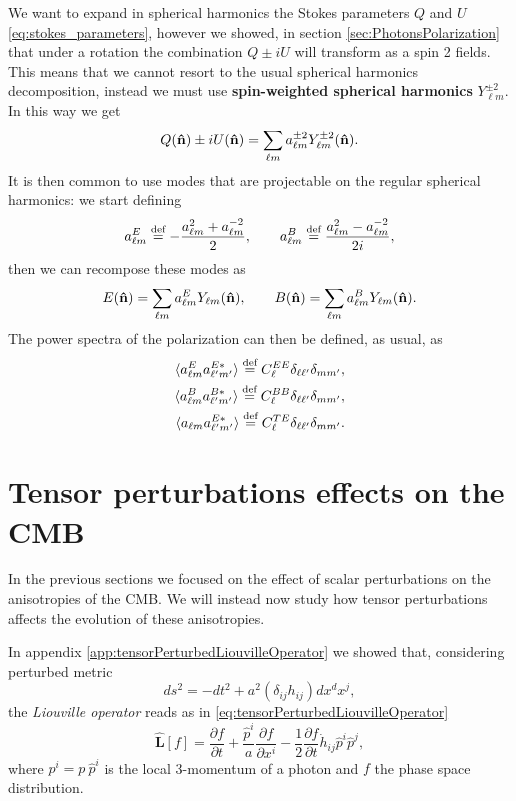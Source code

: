 We want to expand in spherical harmonics the Stokes parameters $Q$ and $U$\eqref{eq:stokes_parameters}, however we showed, in section \ref{sec:PhotonsPolarization} that under a rotation the combination $Q\pm iU$ will transform as a spin 2 fields. This means that we cannot resort to the usual spherical harmonics decomposition, instead we must use \textbf{spin-weighted spherical harmonics} $Y_{\ell m}^{\pm2}$. In this way we get 
$$Q(\mathbf{\hat{n}})\pm iU(\mathbf{\hat{n}}) = \sum_{\ell m}a_{\ell m}^{\pm 2}Y_{\ell m}^{\pm2}(\mathbf{\hat{n}}).$$
It is then common to use modes that are projectable on the regular spherical harmonics: we start defining
$$a^E_{\ell m}\stackrel{\text{def}}{=}-\frac{a^2_{\ell m}+a^{-2}_{\ell m}}{2},\qquad a^B_{\ell m}\stackrel{\text{def}}{=}\frac{a^2_{\ell m}-a^{-2}_{\ell m}}{2i},$$
then we can recompose these modes as
\begin{equation}\label{eq:EBmodes}
    E(\mathbf{\hat{n}})=\sum_{\ell m}a^E_{\ell m}Y_{\ell m}(\mathbf{\hat{n}}),\qquad B(\mathbf{\hat{n}})=\sum_{\ell m}a^B_{\ell m}Y_{\ell m}(\mathbf{\hat{n}}).
\end{equation}
The power spectra of the polarization can then be defined, as usual, as
\begin{align}\label{eq:PolPowerSpectrum}
    \langle a^E_{\ell m}a^{E*}_{\ell' m'}\rangle\stackrel{\text{def}}{=} C_{\ell}^{EE}\delta_{\ell \ell'}\delta_{m m'},\\ \langle a^B_{\ell m}a^{B*}_{\ell' m'}\rangle\stackrel{\text{def}}{=} C_{\ell}^{BB}\delta_{\ell \ell'}\delta_{m m'},\\\langle a_{\ell m}a^{E*}_{\ell' m'}\rangle\stackrel{\text{def}}{=} C_{\ell}^{TE}\delta_{\ell \ell'}\delta_{m m'}.
\end{align}
\section{Tensor perturbations effects on the CMB}\label{sec:TensorPerturbations}
In the previous sections we focused on the effect of scalar perturbations on the anisotropies of the CMB. We will instead now study how tensor perturbations affects the evolution of these anisotropies.

In appendix \ref{app:tensorPerturbedLiouvilleOperator} we showed that, considering perturbed metric $$ds^2=-dt^2+a^2(\delta_{ij}h_{ij})dx^dx^j,$$the \emph{Liouville operator} reads as in \eqref{eq:tensorPerturbedLiouvilleOperator}
$$\hat{\mathbf{L}}[f]=\frac{\partial f}{\partial t}+\frac{\hat p^i}{a}\frac{\partial f}{\partial x^i}-\frac{1}{2}\frac{\partial f}{\partial t}\dot{h}_{ij}\hat p^i\hat p^j,$$
where $p^i=p\ \hat p^i$ is the local 3-momentum of a photon and $f$ the phase space distribution.


